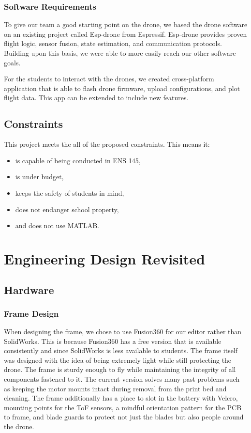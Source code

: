 \documentclass[12pt, titlepage]{article}
\begin{document}
\subsubsection{Software Requirements}

To give our team a good starting point on the drone, we based the drone software on an existing project called Esp-drone from Espressif. Esp-drone provides proven flight logic, sensor fusion, state estimation, and communication protocols. Building upon this basis, we were able to more easily reach our other software goals.

For the students to interact with the drones, we created cross-platform application that is able to flash drone firmware, upload configurations, and plot flight data. This app can be extended to include new features. 

\subsection{Constraints}

This project meets the all of the proposed constraints. This means it:
\begin{itemize}
  \item is capable of being conducted in ENS 145, 
  \item is under budget, 
  \item keeps the safety of students in mind, 
  \item does not endanger school property, 
  \item and does not use MATLAB.
\end{itemize}

\section{Engineering Design Revisited}
\subsection{Hardware}
\subsubsection{Frame Design}
When designing the frame, we chose to use Fusion360 for our editor rather than SolidWorks. This is because Fusion360 has a free version that is available consistently and since SolidWorks is less available to students. The frame itself was designed with the idea of being extremely light while still protecting the drone. The frame is sturdy enough to fly while maintaining the integrity of all components fastened to it. The current version solves many past problems such as keeping the motor mounts intact during removal from the print bed and cleaning. The frame additionally has a place to slot in the battery with Velcro, mounting points for the ToF sensors, a mindful orientation pattern for the PCB to frame, and blade guards to protect not just the blades but also people around the drone. 
\end{document}
